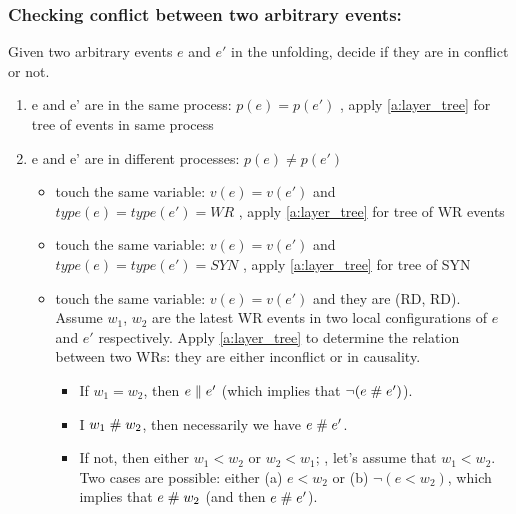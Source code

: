\documentclass{llncs}
\begin{document}
\subsubsection{Checking conflict between two arbitrary events:}
Given two arbitrary events $e$ and $e'$ in the unfolding, decide if they are in conflict or not.
\begin{enumerate}
	\item e and e' are in the same process: $p(e) = p(e')$ , apply \cref{a:layer_tree} for tree of events in same process
	\item e and e' are in different processes: $p(e)\neq p(e')$
		\begin{itemize}
			\item
				touch the same variable: $v(e) = v(e')$ and $ type(e) = type(e') = WR$ , apply 
				\cref{a:layer_tree} for tree of WR events 
			\item
				touch the same variable: $v(e) = v(e')$ and $ type(e) = type(e') = SYN$ , apply 
				\cref{a:layer_tree} for tree of SYN
			\item
				touch the same variable: $v(e) = v(e')$ and they are (RD, RD). Assume $w_1$, $w_2$ are the 
				latest WR events in two local configurations of $e$ and $e'$ respectively. Apply 
				\cref{a:layer_tree} to determine the relation between two WRs: they are either inconflict or
				in causality.
			\begin{itemize}
				\item
					If $w_1 = w_2$, then $e \mathrel{\parallel} e'$ (which implies that $\lnot (e \mathrel{\#} e')$).
				\item
					I $w_1 \mathrel{\#} w_2$, then necessarily we have $e \mathrel{\#} e'$.
				\item
					If not, then either $w_1 < w_2$ or $w_2 < w_1$; \wlogg, let's assume that $w_1 < w_2$.
					Two cases are possible: either (a) $e < w_2$ or (b) $\lnot (e < w_2)$, which implies that $e \mathrel{\#} w_2$
					(and then $e \mathrel{\#} e'$).
					

\end{itemize}
\end{itemize}
\end{enumerate}
\end{document}
